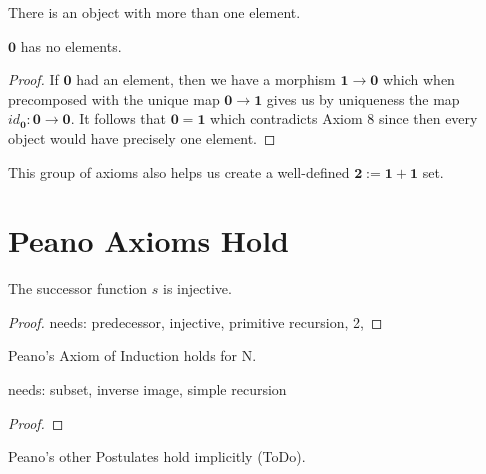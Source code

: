 \begin{axiom}
There is an object with more than one element.
\end{axiom}

\begin{lemma}
$\mathbf{0}$ has no elements.
\end{lemma}

\begin{proof}
If $\mathbf{0}$ had an element, then we have a morphism $\mathbf{1} \longrightarrow \mathbf{0}$ which when precomposed with the unique map $\mathbf{0} \longrightarrow \mathbf{1}$  gives us by uniqueness the map $id_\mathbf{0}:\mathbf{0} \longrightarrow \mathbf{0}$. It follows that $\mathbf{0} = \mathbf{1}$ which contradicts Axiom 8 since then every object would have precisely one element.
\end{proof}

\begin{remark}
This group of axioms also helps us create a well-defined $\mathbf{2} := \mathbf{1}+\mathbf{1}$ set.
\end{remark}


\section{Peano Axioms Hold}

\begin{theorem}
The successor function $s$ is injective.
\end{theorem}

\begin{proof}
needs: predecessor, injective, primitive recursion, 2, 
\end{proof}

\begin{theorem}
Peano's Axiom of Induction holds for N.
\end{theorem}
needs: subset, inverse image, simple recursion
\begin{proof}

\end{proof}

\begin{remark}
Peano's other Postulates hold implicitly (ToDo).
\end{remark}





\clearpage

